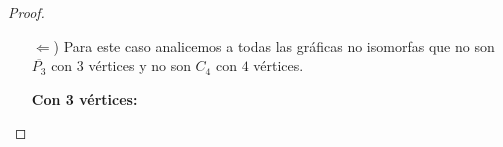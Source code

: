 \documentclass{article}
\begin{document}
\begin{enumerate}
\begin{proof}
\begin{itemize}
\begin{itemize}
      \item[$\cdot\cdot$)] Si $G$ es \textit{escendible completa}, entonces
        $\overline{P_3}$ es subgr\'afica inducida de $G$.
        Supongamos, sin pérdida de generalidad, que $y_0 \in S$ entonces $y_1 \in S$
        ($y_0 y_1 \notin E_G$), luego $y_2 \in S$!! ($y_1 y_2 \notin E_G$), pero
        no todos los $y_i$'s pueden estar en $S$. Si $y_0 \in K$, entonces
        $y_1 \in S$ o $y_1 \in K$ implican que $y_0$ es adyacente a $y_1$!! pero
        $y_0 y_1 \notin E_G$ y he aqu\'i una contradicci\'on de suponer a $\overline{P_3}$
        como subgr\'afica inducida de $G$.  Por tanto, se concluye que $\overline{P_3}$
        no est\'a contenida como subgr\'afica inducida en $G$.
        
        
      \end{itemize}
    \item[$\Leftarrow$)] Para este caso analicemos a todas las gr\'aficas no isomorfas
      que no son $\overline{P_3}$ con $3$ v\'ertices y no son $C_4$ con $4$ v\'ertices.
      
      \textbf{Con 3 v\'ertices:}
      
      \begin{figure}[ht!]
        \centering
\end{figure}
\end{itemize}
\end{proof}
\end{enumerate}
\end{document}
